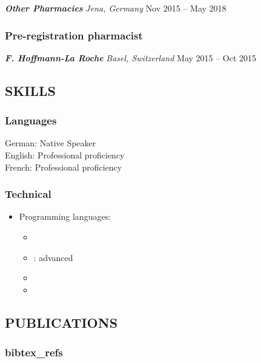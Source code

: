 \documentclass[
  letterpaper,
  DIV=11,
  numbers=noendperiod]{scrartcl}
\providecommand{\tightlist}{%
  \setlength{\itemsep}{0pt}\setlength{\parskip}{0pt}}\usepackage{longtable,booktabs,array}
\begin{document}
\textbf{\emph{Other Pharmacies}} \emph{Jena, Germany} {Nov 2015 -- May
2018}

\subsubsection{Pre-registration
pharmacist}\label{pre-registration-pharmacist}

\textbf{\emph{F. Hoffmann-La Roche}} \emph{Basel, Switzerland} {May 2015
-- Oct 2015}

\subsection{SKILLS}\label{skills}

\subsubsection{Languages}\label{languages}

German: Native Speaker\\
English: Professional proficiency\\
French: Professional proficiency

\subsubsection{Technical}\label{technical}

\begin{itemize}
\tightlist
\item
  Programming languages:

  \begin{itemize}
  \item
  \item
     : advanced
  \item
  \item
  \end{itemize}
\end{itemize}

\subsection{PUBLICATIONS}\label{publications}

\subsubsection{bibtex\_refs}\label{bibtex_refs}
\end{document}
